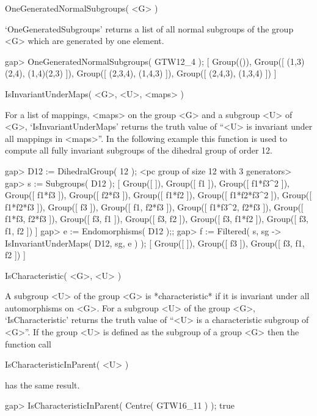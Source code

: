 

\>OneGeneratedNormalSubgroups( <G> )

`OneGeneratedSubgroups' returns a list of all normal subgroups of the group 
<G> which are generated by one element.

\beginexample
    gap> OneGeneratedNormalSubgroups( GTW12_4 );
    [ Group(()), Group([ (1,3)(2,4), (1,4)(2,3) ]), 
      Group([ (2,3,4), (1,4,3) ]), Group([ (2,4,3), (1,3,4) ]) ]
\endexample



\>IsInvariantUnderMaps( <G>, <U>, <maps> )

For a list of mappings, <maps> on the group <G> and
a subgroup <U> of <G>, `IsInvariantUnderMaps' returns the truth 
value of ``<U> is invariant under all mappings in <maps>''. In the following
example this function is used to compute all fully invariant subgroups of
the dihedral group of order 12.

\beginexample
    gap> D12 := DihedralGroup( 12 );                                        
    <pc group of size 12 with 3 generators>
    gap> s := Subgroups( D12 );
    [ Group([  ]), Group([ f1 ]), Group([ f1*f3^2 ]), Group([ f1*f3 ]), 
      Group([ f2*f3 ]), Group([ f1*f2 ]), Group([ f1*f2*f3^2 ]), 
      Group([ f1*f2*f3 ]), Group([ f3 ]), Group([ f1, f2*f3 ]), 
      Group([ f1*f3^2, f2*f3 ]), Group([ f1*f3, f2*f3 ]), 
      Group([ f3, f1 ]), Group([ f3, f2 ]), Group([ f3, f1*f2 ]), 
      Group([ f3, f1, f2 ]) ]
    gap> e := Endomorphisms( D12 );;                                        
    gap> f := Filtered( s, sg -> IsInvariantUnderMaps( D12, sg, e ) );
    [ Group([  ]), Group([ f3 ]), Group([ f3, f1, f2 ]) ]
\endexample

\>IsCharacteristic( <G>, <U> )

A subgroup <U> of the group <G> is *characteristic* if it is invariant under
all automorphisms on <G>. For a subgroup <U> of the group <G>,
`IsCharacteristic' returns the truth value of ``<U> is a characteristic
subgroup of <G>''. If the group <U> is defined as the subgroup of a group
<G> then the function call

\>IsCharacteristicInParent( <U> )

has the same result.

\beginexample
    gap> IsCharacteristicInParent( Centre( GTW16_11 ) );
    true
\endexample

